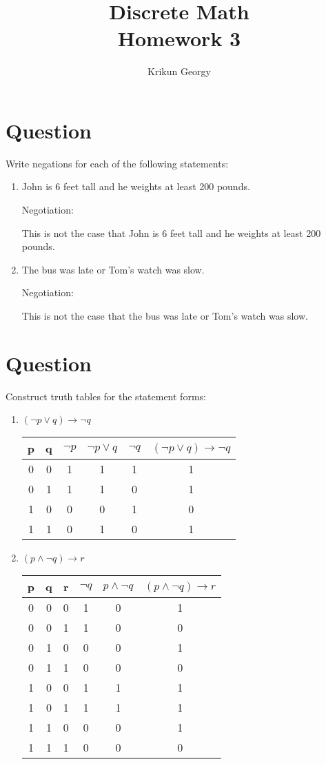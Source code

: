 \documentclass[a4paper,11pt]{article}
\author{Krikun Georgy}
\title{Discrete Math\\Homework 3}
\begin{document}
\maketitle
\thispagestyle{empty}
\newpage
\section{Question}
\label{sec:Question}
Write negations for each of the following statements:

\begin{enumerate}[label=\alph*)]
  \item
  John is 6 feet tall and he weights at least 200 pounds.

  Negotiation:

  This is not the case that John is 6 feet tall and he weights at least 200 pounds.
  \item
  The bus was late or Tom’s watch was slow.

  Negotiation:

  This is not the case that the bus was late or Tom’s watch was slow.
\end{enumerate}

\section{Question}
\label{sec:Question}
Construct truth tables for the statement forms:

\begin{enumerate}[label=\alph*)]
  \item
  $(\neg p \vee q)\rightarrow \neg q$\\

  \begin{tabular}{|cc|cccc|}
    \hline
    p & q & $\neg p$ & $\neg p \vee q$ & $\neg q$ & $(\neg p \vee q)\rightarrow \neg q$\\
    \hline
    0 & 0 & 1 & 1 & 1 & 1\\
    0 & 1 & 1 & 1 & 0 & 1\\
    1 & 0 & 0 & 0 & 1 & 0\\
    1 & 1 & 0 & 1 & 0 & 1\\
    \hline
  \end{tabular}
  \item
  $(p \wedge \neg q)\rightarrow r$\\

  \begin{tabular}{|ccc|ccc|}
    \hline
    p & q & r & $\neg q$ & $p \wedge \neg q$ & $(p \wedge \neg q)\rightarrow r$\\
    \hline
    0 & 0 & 0 & 1 & 0 & 1\\
    0 & 0 & 1 & 1 & 0 & 0\\
    0 & 1 & 0 & 0 & 0 & 1\\
    0 & 1 & 1 & 0 & 0 & 0\\
    1 & 0 & 0 & 1 & 1 & 1\\
    1 & 0 & 1 & 1 & 1 & 1\\
    1 & 1 & 0 & 0 & 0 & 1\\
    1 & 1 & 1 & 0 & 0 & 0\\
    \hline
  \end{tabular}
\end{enumerate}
\end{document}
